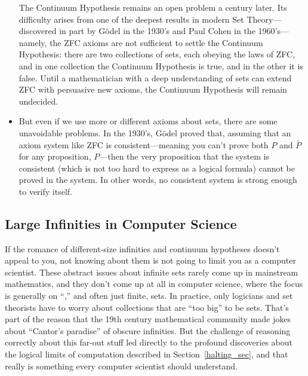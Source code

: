 \begin{itemize}
  The Continuum Hypothesis remains an open problem a century later.
  Its difficulty arises from one of the deepest results in modern Set
  Theory---discovered in part by G\"odel in the 1930's and Paul
  Cohen in the 1960's---namely, the ZFC axioms are not
  sufficient to settle the Continuum Hypothesis: there are two
  collections of sets, each obeying the laws of
  ZFC, and in one collection the
  Continuum Hypothesis is true, and in the other it is false.  Until a
  mathematician with a deep understanding of sets can extend ZFC with
  persuasive new axioms, the Continuum Hypothesis will remain
  undecided.  \iffalse So settling the Continuum Hypothesis some new
  understanding of what Sets should be to arrive at persuasive new
  axioms that extend ZFC and are strong enough to determine the truth
  of the Continuum Hypothesis one way or the other.  \fi
\item But even if we use more or different axioms about sets, there
  are some unavoidable problems.  In the 1930's, G\"odel%
 proved that, assuming that an axiom system like ZFC is
  consistent---meaning you can't prove both $P$ and $\bar{P}$ for any
  proposition, $P$---then the very proposition that the system is
  consistent (which is not too hard to express as a logical formula)
  cannot be proved in the system.  In other words, no consistent
  system is strong enough to verify itself.
  
\end{itemize}

\subsection{Large Infinities in Computer Science}

If the romance of different-size infinities and continuum hypotheses
doesn't appeal to you, not knowing about them is not going to limit
you as a computer scientist.  These abstract issues about infinite
sets rarely come up in mainstream mathematics, and they don't come up
at all in computer science, where the focus is generally on
``,'' and often just finite, sets.  In practice, only
logicians and set theorists have to worry about collections that are
``too big'' to be sets.  That's part of the reason that the 19th
century mathematical community made jokes about ``Cantor's
  paradise'' of obscure infinities.  But the challenge of
reasoning correctly about this far-out stuff led directly to the
profound discoveries about the logical limits of computation described
in Section~\ref{halting_sec}, and that really is something every
computer scientist should understand.

